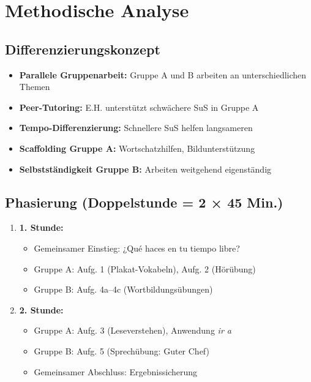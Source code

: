 \documentclass[11pt,a4paper]{article}
\begin{document}
\section{Methodische Analyse}

\subsection{Differenzierungskonzept}
\begin{itemize}
    \item \textbf{Parallele Gruppenarbeit:} Gruppe A und B arbeiten an unterschiedlichen Themen
    \item \textbf{Peer-Tutoring:} E.H. unterstützt schwächere SuS in Gruppe A
    \item \textbf{Tempo-Differenzierung:} Schnellere SuS helfen langsameren
    \item \textbf{Scaffolding Gruppe A:} Wortschatzhilfen, Bildunterstützung
    \item \textbf{Selbstständigkeit Gruppe B:} Arbeiten weitgehend eigenständig
\end{itemize}

\subsection{Phasierung (Doppelstunde = 2 × 45 Min.)}
\begin{enumerate}
    \item \textbf{1. Stunde:}
    \begin{itemize}
        \item Gemeinsamer Einstieg: ¿Qué haces en tu tiempo libre?
        \item Gruppe A: Aufg. 1 (Plakat-Vokabeln), Aufg. 2 (Hörübung)
        \item Gruppe B: Aufg. 4a--4c (Wortbildungsübungen)
    \end{itemize}
    \item \textbf{2. Stunde:}
    \begin{itemize}
        \item Gruppe A: Aufg. 3 (Leseverstehen), Anwendung \textit{ir a}
        \item Gruppe B: Aufg. 5 (Sprechübung: Guter Chef)
        \item Gemeinsamer Abschluss: Ergebnissicherung
    \end{itemize}
\end{enumerate}
\end{document}
